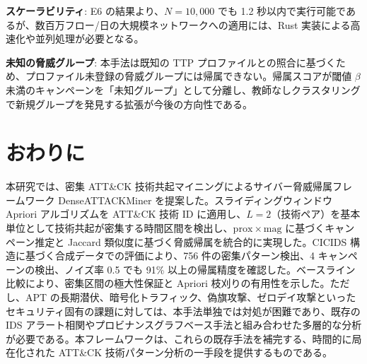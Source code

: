 \documentclass[11pt]{article}
\begin{document}
\textbf{スケーラビリティ}: E6 の結果より、$N = 10{,}000$ でも 1.2 秒以内で実行可能であるが、数百万フロー/日の大規模ネットワークへの適用には、Rust 実装による高速化や並列処理が必要となる。

\textbf{未知の脅威グループ}: 本手法は既知の TTP プロファイルとの照合に基づくため、プロファイル未登録の脅威グループには帰属できない。帰属スコアが閾値 $\beta$ 未満のキャンペーンを「未知グループ」として分離し、教師なしクラスタリングで新規グループを発見する拡張が今後の方向性である。

\section{おわりに}\label{sec:conclusion}

本研究では、密集 ATT\&CK 技術共起マイニングによるサイバー脅威帰属フレームワーク DenseATTACKMiner を提案した。スライディングウィンドウ Apriori アルゴリズムを ATT\&CK 技術 ID に適用し、$L=2$（技術ペア）を基本単位として技術共起が密集する時間区間を検出し、$\mathrm{prox} \times \mathrm{mag}$ に基づくキャンペーン推定と Jaccard 類似度に基づく脅威帰属を統合的に実現した。CICIDS 構造に基づく合成データでの評価により、756 件の密集パターン検出、4 キャンペーンの検出、ノイズ率 0.5 でも 91\% 以上の帰属精度を確認した。ベースライン比較により、密集区間の極大性保証と Apriori 枝刈りの有用性を示した。ただし、APT の長期潜伏、暗号化トラフィック、偽旗攻撃、ゼロデイ攻撃といったセキュリティ固有の課題に対しては、本手法単独では対処が困難であり、既存の IDS アラート相関やプロビナンスグラフベース手法と組み合わせた多層的な分析が必要である。本フレームワークは、これらの既存手法を補完する、時間的に局在化された ATT\&CK 技術パターン分析の一手段を提供するものである。



\end{document}
